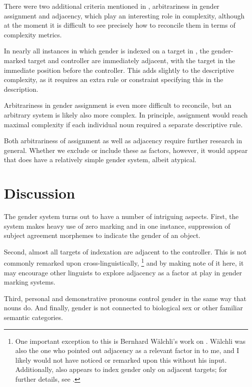 \documentclass[output=collectionpaper,hidelinks]{langscibook}
\theoremstyle{remark}
\begin{document}
There were two additional criteria mentioned in ,
arbitrariness in gender assignment and adjacency, which play an interesting role
in complexity, although at the moment it is difficult to see precisely how to
reconcile them in terms of complexity metrics.

In nearly all instances in which gender is indexed on a target in , the
gender-marked target and controller are immediately adjacent, with the target in
the immediate position before the controller.  This adds slightly to the
descriptive complexity, as it requires an extra rule or constraint specifying
this in the description.

Arbitrariness in gender assignment is even more difficult to reconcile, but an
arbitrary system is likely also more complex.  In principle, assignment would
reach maximal complexity if each individual noun required a separate descriptive
rule.

Both arbitrariness of assignment as well as adjacency require further research
in general.  Whether we exclude or include these as factors, however, it would
appear that  does have a relatively simple gender system, albeit atypical.

\section{Discussion}
\label{sec:Discussion}

The  gender system turns out to have a number of intriguing aspects.
First, the system makes heavy use of zero marking and in one instance,
suppression of subject agreement morphemes to indicate the gender of an object.

Second, almost all targets of indexation are adjacent to the controller. This
is not commonly remarked upon cross-linguistically,%
\footnote{One important exception to this is Bernhard Wälchli's work on 
\citep{Waelchli2018}.  Wälchli was also the one who pointed out
adjacency as a relevant factor in  to me, and I likely would not have
noticed or remarked upon this without his input.  Additionally,  also
appears to index gender only on adjacent targets; for further details, see
\citet{Gueldemann2006}.} %
and by making note of it here, it may encourage other linguists to explore
adjacency as a factor at play in gender marking systems.

Third, personal and demonstrative pronouns control gender in the same way that
nouns do.  And finally, gender is not connected to biological sex or other
familiar semantic categories.
\end{document}
